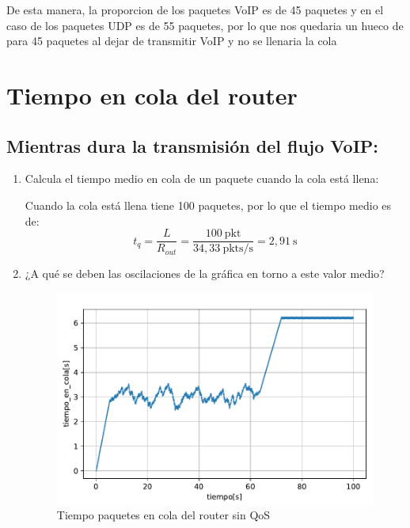 De esta manera, la proporcion de los paquetes VoIP es de 45 paquetes y en el caso de los paquetes UDP es de 55 paquetes, por lo que
nos quedaria un hueco de para 45 paquetes al dejar de transmitir VoIP y no se llenaria la cola

\section{Tiempo en cola del router}

\subsection{Mientras dura la transmisión del flujo VoIP:}
\begin{enumerate}
    
    \item Calcula el tiempo medio en cola de un paquete cuando la cola está llena: \label{item:a}
    
    Cuando la cola está llena tiene 100 paquetes, por lo que el tiempo medio es de:
        \[
          t_{q} = \frac{L}{R_{out}} = \frac{100~\mathrm{pkt}}{34,33~\mathrm{pkts/s}} = 2,91~\mathrm{s}
        \]
    
    \item ¿A qué se deben las oscilaciones de la gráfica en torno a este valor medio? \label{item:b}
    
    \begin{figure}[!ht]
        \centering
        \includegraphics{graficas/sinQoS/tiempo_en_cola_sinQoS.pdf}
        \caption{Tiempo paquetes en cola del router sin QoS}
        \label{fig:sinqos_time}
    \end{figure}


\end{enumerate}
